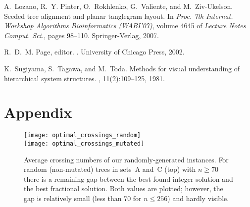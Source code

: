 \documentclass[runningheads,a4paper]{llncs}
\begin{document}
\begin{thebibliography}{10}
A.~Lozano, R.~Y. Pinter, O.~Rokhlenko, G.~Valiente, and M.~Ziv-Ukelson.
\newblock Seeded tree alignment and planar tanglegram layout.
\newblock In {\em Proc. 7th Internat.
  Workshop Algorithms Bioinformatics (WABI'07)}, volume 4645 of {\em Lecture
  Notes Comput. Sci.}, pages 98--110. Springer-Verlag, 2007.

R.~D.~M. Page, editor.
.
\newblock University of Chicago Press, 2002.

K.~Sugiyama, S.~Tagawa, and M.~Toda.
\newblock Methods for visual understanding of hierarchical system structures.
,
  11(2):109--125, 1981.

\end{thebibliography}




\newpage
\appendix
\section*{Appendix}
\renewcommand{\textfraction}{0.1}
\begin{figure}[h]
  \centering
  \texttt{[image: optimal\_crossings\_random]}\\
  \texttt{[image: optimal\_crossings\_mutated]}
  \caption{Average crossing numbers of our randomly-generated
    instances. For random (non-mutated) trees in sets~A and~C (top)
    with $n \ge 70$ there is a remaining gap between the best found
    integer solution and the best fractional solution. Both values are
    plotted; however, the gap is relatively small (less than 70 for $n
    \le 256$) and hardly visible.}
  \label{fig:crnumbers-random}
\end{figure}
\end{document}
